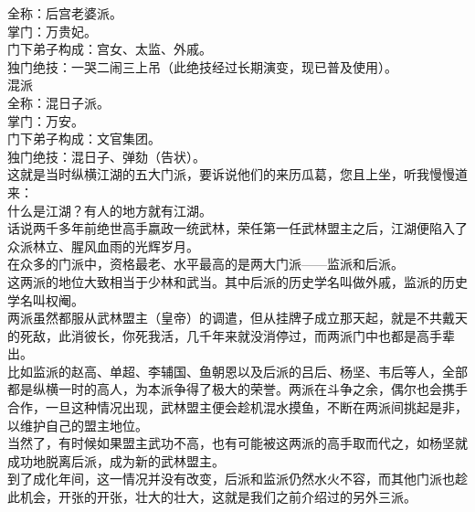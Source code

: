 \begin{multicols}{\theparacolNo}
全称：后宫老婆派。\\

掌门：万贵妃。\\

门下弟子构成：宫女、太监、外戚。\\

独门绝技：一哭二闹三上吊（此绝技经过长期演变，现已普及使用）。\\

混派\\

全称：混日子派。\\

掌门：万安。\\

门下弟子构成：文官集团。\\

独门绝技：混日子、弹劾（告状）。\\

这就是当时纵横江湖的五大门派，要诉说他们的来历瓜葛，您且上坐，听我慢慢道来：\\

什么是江湖？有人的地方就有江湖。\\

话说两千多年前绝世高手嬴政一统武林，荣任第一任武林盟主之后，江湖便陷入了众派林立、腥风血雨的光辉岁月。\\

在众多的门派中，资格最老、水平最高的是两大门派——监派和后派。\\

这两派的地位大致相当于少林和武当。其中后派的历史学名叫做外戚，监派的历史学名叫权阉。\\

两派虽然都服从武林盟主（皇帝）的调遣，但从挂牌子成立那天起，就是不共戴天的死敌，此消彼长，你死我活，几千年来就没消停过，而两派门中也都是高手辈出。\\

比如监派的赵高、单超、李辅国、鱼朝恩以及后派的吕后、杨坚、韦后等人，全部都是纵横一时的高人，为本派争得了极大的荣誉。两派在斗争之余，偶尔也会携手合作，一旦这种情况出现，武林盟主便会趁机混水摸鱼，不断在两派间挑起是非，以维护自己的盟主地位。\\

当然了，有时候如果盟主武功不高，也有可能被这两派的高手取而代之，如杨坚就成功地脱离后派，成为新的武林盟主。\\

到了成化年间，这一情况并没有改变，后派和监派仍然水火不容，而其他门派也趁此机会，开张的开张，壮大的壮大，这就是我们之前介绍过的另外三派。\\


\end{multicols}
